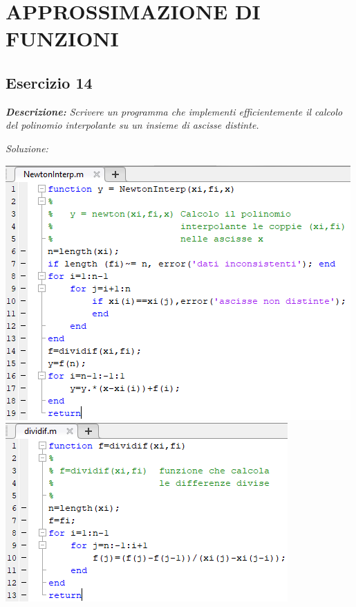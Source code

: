 \chapter{APPROSSIMAZIONE DI FUNZIONI}
\section{Esercizio 14}

\textit{\textbf{Descrizione:} Scrivere un programma che implementi efficientemente il calcolo del polinomio interpolante su un insieme di ascisse distinte.}\newline

\noindent\emph{Soluzione: }\newline

\includegraphics[width=1.3\linewidth]{img/NewtonInter.png}
\includegraphics[width=1.3\linewidth]{img/dividif.png}\newpage